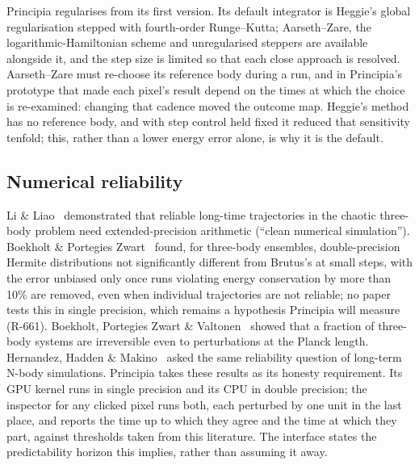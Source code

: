\documentclass[11pt,a4paper]{article}
\begin{document}
Principia regularises from its first version.  Its default integrator is Heggie's global
regularisation stepped with fourth-order Runge--Kutta; Aarseth--Zare, the logarithmic-Hamiltonian
scheme and unregularised steppers are available alongside it, and the step size is limited so that
each close approach is resolved.  Aarseth--Zare must re-choose its reference body during a run, and
in Principia's prototype that made each pixel's result depend on the times at which the choice is
re-examined: changing that cadence moved the outcome map.  Heggie's method has no reference body,
and with step control held fixed it reduced that sensitivity tenfold; this, rather than a lower
energy error alone, is why it is the default.

\subsection{Numerical reliability}
\label{sec:reliability}

Li \& Liao~\cite{li2017} demonstrated that reliable long-time trajectories in the chaotic
three-body problem need extended-precision arithmetic (``clean numerical simulation'').  Boekholt
\& Portegies Zwart~\cite{boekholt2015} found, for three-body ensembles, double-precision Hermite distributions not significantly different from Brutus's at small steps,
with the error unbiased only once runs violating energy conservation by more than 10\% are removed, even when individual trajectories
are not reliable; no paper tests this in single precision, which remains a hypothesis Principia will measure (R-661). Boekholt, Portegies Zwart \& Valtonen~\cite{boekholt2020} showed that a fraction of
three-body systems are irreversible even to perturbations at the Planck length.  Hernandez,
Hadden \& Makino~\cite{hernandez2020} asked the same reliability question of long-term N-body
simulations.  Principia takes these results as its honesty requirement.  Its GPU kernel runs in
single precision and its CPU in double precision; the inspector for any clicked pixel runs both,
each perturbed by one unit in the last place, and reports the time up to which they agree and the
time at which they part, against thresholds taken from this literature.  The interface states the
predictability horizon this implies, rather than assuming it away.
\end{document}
